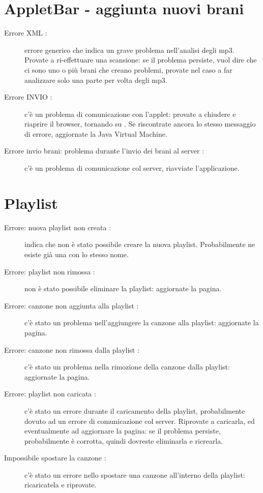 \section{AppletBar - aggiunta nuovi brani}
\begin{description}
	\item [Errore XML :] errore generico che
	indica un grave problema nell'analisi degli mp3. Provate a ri-effettuare una
	scansione: se il problema persiste, vuol dire che ci sono uno o pi\`u brani che
	creano problemi, provate nel caso a far analizzare solo una parte per volta
	degli mp3.
	\item [Errore INVIO :] c'\`e un problema di comunicazione con l'applet:
	provate a chiudere e riaprire il browser, tornando su . Se
	riscontrate ancora lo stesso messaggio di errore, aggiornate la Java Virtual
	Machine.
	\item [Errore invio brani: problema durante l'invio dei brani al server :]
	c'\`e un problema di comunicazione col server, riavviate l'applicazione.
\end{description}

\section{Playlist}
\begin{description}
	\item [Errore: nuova playlist non creata :] indica che non \`e stato
	possibile creare la nuova playlist. Probabilmente ne esiste gi\`a una con lo
	stesso nome.
	\item [Errore: playlist non rimossa :] non \`e stato possibile
	eliminare la playlist: aggiornate la pagina.
	\item [Errore: canzone non aggiunta alla playlist :] c'\`e stato un
	problema nell'aggiungere la canzone alla playlist: aggiornate la pagina.
	\item [Errore: canzone non rimossa dalla playlist :] c'\`e stato un
	problema nella rimozione della canzone dalla playlist: aggiornate la pagina.
	\item [Errore: playlist non caricata :] c'\`e stato un errore durante
	il caricamento della playlist, probabilmente dovuto ad un errore di
	comunicazione col server. Riprovate a caricarla, ed eventualmente ad aggiornare
	la pagina: se il problema persiste, probabilmente \`e corrotta, quindi dovreste
	eliminarla e ricrearla.
	\item [Impossibile spostare la canzone :] c'\`e stato un errore nello
	spostare una canzone all'interno della playlist: ricaricatela e riprovate.
\end{description}


